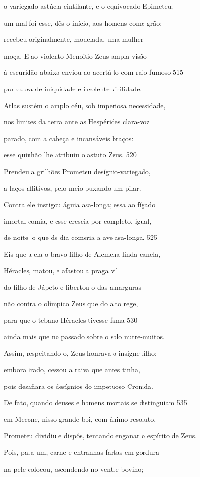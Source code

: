 o variegado astúcia-cintilante, e o equivocado Epimeteu;

um mal foi esse, dês o início, aos homens come-grão:

recebeu originalmente, modelada, uma mulher

moça. E ao violento Menoitio Zeus ampla-visão

à escuridão abaixo enviou ao acertá-lo com raio fumoso \num{515}

por causa de iniquidade e insolente virilidade.

Atlas sustém o amplo céu, sob imperiosa necessidade,

nos limites da terra ante as Hespérides clara-voz

parado, com a cabeça e incansáveis braços:

esse quinhão lhe atribuiu o astuto Zeus. \num{520}

Prendeu a grilhões Prometeu desígnio-variegado,

a laços aflitivos, pelo meio puxando um pilar.

Contra ele instigou águia asa-longa; essa ao fígado

imortal comia, e esse crescia por completo, igual,

de noite, o que de dia comeria a ave asa-longa. \num{525}

Eis que a ela o bravo filho de Alcmena linda-canela,

Héracles, matou, e afastou a praga vil

do filho de Jápeto e libertou-o das amarguras

não contra o olímpico Zeus que do alto rege,

para que o tebano Héracles tivesse fama \num{530}

ainda mais que no passado sobre o solo nutre-muitos.

Assim, respeitando-o, Zeus honrava o insigne filho;

embora irado, cessou a raiva que antes tinha,

pois desafiara os desígnios do impetuoso Cronida.

\quad{}De fato, quando deuses e homens mortais se distinguiam \num{535}

em Mecone, nisso grande boi, com ânimo resoluto,

Prometeu dividiu e dispôs, tentando enganar o espírito de \qb{}Zeus.

Pois, para um, carne e entranhas fartas em gordura

na pele colocou, escondendo no ventre bovino;

